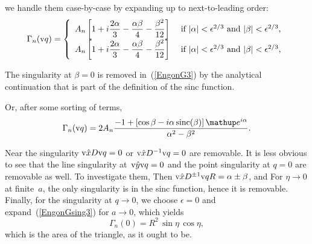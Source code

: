 we handle them case-by-case
by expanding up to next-to-leading order:
\begin{equation}
  \Gamma_n(\text{v}{q}) = \left\{\begin{array}{ll}
  \displaystyle
  A_n\left[ 1 + i\frac{2\alpha}{3} - \frac{\alpha\beta}{4} - \frac{\beta^2}{12}
     \right]
  &\text{ if $|\alpha|<\epsilon^{2/3}$ and $|\beta|<\epsilon^{2/3}$,}\\
  \displaystyle
  A_n\left[ 1 + i\frac{2\alpha}{3} - \frac{\alpha\beta}{4} - \frac{\beta^2}{12}
     \right]
  &\text{ if $|\alpha|<\epsilon^{2/3}$ and $|\beta|<\epsilon^{2/3}$,}\\
  \end{array}\right.
\end{equation}

The singularity at $\beta=0$ is removed in~(\ref{EngonG3})
by the analytical continuation that is part of the definition
of the sinc function.

Or, after some sorting of terms,
\begin{equation}\label{EngonG3}
  \Gamma_n(\q) = 2 A_n
   \frac{ -1+\left[\cos\tqy
        -i\tqx\sinc(\tqy)\right]\e^{i\tqx}}
   {\tqx^2-\tqy^2}.
\end{equation}

Near the singularity
$\text{v}{\hat x} D\text{v}{q}=0$ or $\text{v}{\hat x} D^{-1}\text{v}{q}=0$ are removable.
It is less obvious to see that the line singularity at~$\text{v}{\hat y}\text{v}{q}=0$ and
the point singularity at $q=0$ are removable as well.
To investigate them,
Then $\text{v}{\hat x} D^{\pm1}\text{v}{q} R = \alpha\pm\beta$,
and
For $\eta\to0$ at finite~$a$, the only singularity is in the sinc function,
hence it is removable.
Finally, for the singularity at $q\to0$, we choose $\epsilon=0$ and
expand~(\ref{EngonGsing3}) for $a\to0$,
which yields
\begin{equation}
  \Gamma_n(0) = R^2\,\sin\eta\,\cos\eta,
\end{equation}
which is the area of the triangle, as it ought to be.

\iffalse
\section{Special functions near the removable singularity}

\index{Machine epsilon}
We assume a double-precision machine epsilon
of $\epsilon=2^{-52}\simeq2.2\cdot10^{-16}$.

\fi

